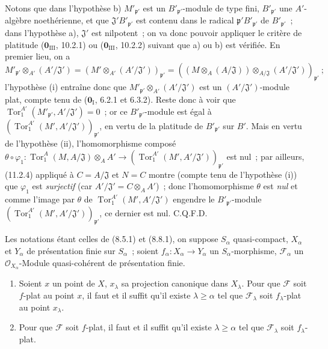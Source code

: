 Notons que dans l'hypothèse b) $M'_{\mathfrak p'}$ est un
$B'_{\mathfrak p'}$-module de type fini, $B'_{\mathfrak p'}$ une
$A'$-algèbre noethérienne, et que $\mathfrak J'B'_{\mathfrak p'}$ est
contenu dans le radical $\mathfrak p'B'_{\mathfrak p'}$ de
$B'_{\mathfrak p'}$~; dans l'hypothèse a), $\mathfrak J'$ est nilpotent~;
on va donc pouvoir appliquer le critère de platitude
($\mathbf 0_{\mathrm{III}}$, 10.2.1) ou ($\mathbf 0_{\mathrm{III}}$, 10.2.2)
suivant que a) ou b) est vérifiée. En premier lieu, on a
\[
M'_{\mathfrak p'}\otimes_{A'}(A'/\mathfrak J')
=(M'\otimes_{A'}(A'/\mathfrak J'))_{\mathfrak p'}
=((M\otimes_A(A/\mathfrak J))\otimes_{A/\mathfrak J}
(A'/\mathfrak J'))_{\mathfrak p'}~;
\]
l'hypothèse (i) entraîne donc que
$M'_{\mathfrak p'}\otimes_{A'}(A'/\mathfrak J')$ est un
$(A'/\mathfrak J')$-module plat, compte tenu de
($\mathbf 0_{\mathrm I}$, 6.2.1 et 6.3.2). Reste donc à voir que
$\operatorname{Tor}_1^{A'}(M'_{\mathfrak p'},A'/\mathfrak J')=0$~; or ce
$B'_{\mathfrak p'}$-module est égal à
$(\operatorname{Tor}_1^{A'}(M',A'/\mathfrak J'))_{\mathfrak p'}$, en vertu
de la platitude de $B'_{\mathfrak p'}$ sur $B'$. Mais en vertu de
l'hypothèse (ii), l'homomorphisme composé
$\theta\circ\varphi_1:\operatorname{Tor}_1^A(M,A/\mathfrak J)\otimes_AA'
\to(\operatorname{Tor}_1^{A'}(M',A'/\mathfrak J'))_{\mathfrak p'}$ est
nul~; par ailleurs, (11.2.4) appliqué à $C=A/\mathfrak J$ et $N=C$ montre
(compte tenu de l'hypothèse (i)) que $\varphi_1$ est \emph{surjectif} (car
$A'/\mathfrak J'=C\otimes_AA'$)~; donc l'homomorphisme $\theta$ est
\emph{nul} et comme l'image par $\theta$ de
$\operatorname{Tor}_1^{A'}(M',A'/\mathfrak J')$ engendre le
$B'_{\mathfrak p'}$-module
$(\operatorname{Tor}_1^{A'}(M',A'/\mathfrak J'))_{\mathfrak p'}$, ce
dernier est nul. C.Q.F.D.

\begin{theorem}[11.2.6]
\label{IV.11.2.6-fr}
Les notations étant celles de (8.5.1) et (8.8.1), on suppose $S_\alpha$
quasi-compact, $X_\alpha$ et $Y_\alpha$ de présentation finie sur
$S_\alpha$~; soient $f_\alpha:X_\alpha\to Y_\alpha$ un
$S_\alpha$-morphisme, $\mathcal F_\alpha$ un
$\mathcal O_{X_\alpha}$-Module quasi-cohérent de présentation finie.


\begin{enumerate}[label=\emph{(\roman*)}]
\item Soient $x$ un point de $X$, $x_\lambda$ sa projection canonique dans
$X_\lambda$. Pour que $\mathcal F$ soit $f$-plat au point $x$, il faut et il
suffit qu'il existe $\lambda\geq\alpha$ tel que $\mathcal F_\lambda$ soit
$f_\lambda$-plat au point $x_\lambda$.
\item Pour que $\mathcal F$ soit $f$-plat, il faut et il suffit qu'il existe
$\lambda\geq\alpha$ tel que $\mathcal F_\lambda$ soit $f_\lambda$-plat.
\end{enumerate}
\end{theorem}

